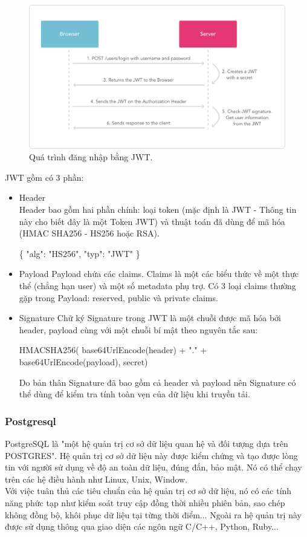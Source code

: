 \documentclass[a4paper,12pt,oneside]{article}
\begin{document}
\begin{figure}[H]
	\centering
	\includegraphics[scale=.35]{hinh/jwt2.png}
	\caption{Quá trình đăng nhập bằng JWT\cite{jwt}.}
	\label{fig:jwt2}
\end{figure}

JWT gồm có 3 phần: 
\begin{itemize}
\item Header\\
Header bao gồm hai phần chính: loại token (mặc định là JWT - Thông tin này cho biết đây là một Token JWT) và thuật toán đã dùng để mã hóa (HMAC SHA256 - HS256 hoặc RSA). 

\begin{center}
\{ "alg": "HS256", "typ": "JWT" \} 
\end{center}

\item Payload 
Payload chứa các claims. Claims là một các biểu thức về một thực thể (chẳng hạn user) và một số metadata phụ trợ. Có 3 loại claims thường gặp trong Payload: reserved, public và private claims. 
\item Signature 
Chữ ký Signature trong JWT là một chuỗi được mã hóa bởi header, payload cùng với một chuỗi bí mật theo nguyên tắc sau: 
\begin{center}
HMACSHA256(  base64UrlEncode(header) + "." +  base64UrlEncode(payload),  secret) 
\end{center}
Do bản thân Signature đã bao gồm cả header và payload nên Signature có thể dùng để kiểm tra tính toàn vẹn của dữ liệu khi truyền tải. 
 
\end{itemize}

\subsubsection{Postgresql}
\noindent PostgreSQL là "một hệ quản trị cơ sở dữ liệu quan hệ và đối tượng dựa trên POSTGRES"\cite{sql}. Hệ quản trị cơ sở dữ liệu này được kiểm chứng và tạo được lòng tin với người sử dụng về độ an toàn dữ liệu, đúng đắn, bảo mật. Nó có thể chạy trên các hệ điều hành như Linux, Unix, Window. \\
Với việc tuân thủ các tiêu chuẩn của hệ quản trị cơ sở dữ liệu, nó có các tính năng phức tạp như kiểm soát truy cập đồng thời nhiều phiên bản, sao chép không đồng bộ, khôi phục dữ liệu tại từng thời điểm... Ngoài ra hệ quản trị này được sử dụng thông qua giao diện các ngôn ngữ C/C++, Python, Ruby...
\end{document}
